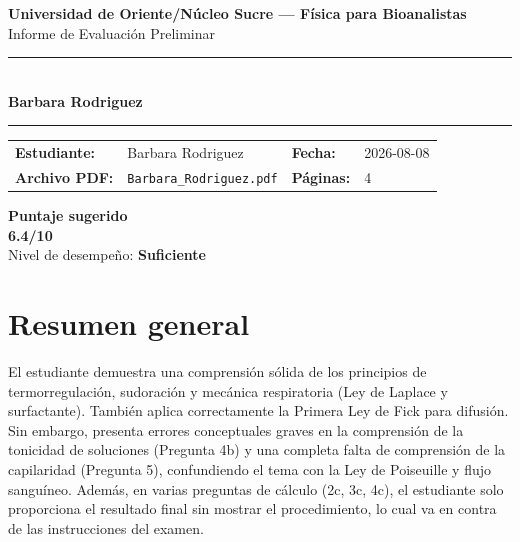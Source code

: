 \documentclass[11pt,a4paper]{article}
\begin{document}
\begin{center}
  {\Large\bfseries\color{azulTitulo} Universidad de Oriente/Núcleo Sucre --- Física para Bioanalistas}\\[4pt]
  {\large Informe de Evaluación Preliminar}\\[12pt]
  \rule{\linewidth}{1.2pt}\\[6pt]
  {\LARGE\bfseries Barbara Rodriguez}\\[4pt]
  \rule{\linewidth}{0.6pt}
\end{center}

\vspace{4pt}
\begin{tcolorbox}[cajaTitulo, title=Datos del informe]
\begin{tabular}{@{}llll@{}}
  \textbf{Estudiante:}  & Barbara Rodriguez  &
  \textbf{Fecha:}       & 2026-08-08 \\[4pt]
  \textbf{Archivo PDF:} & \texttt{Barbara\_Rodriguez.pdf}  &
  \textbf{Páginas:}     & 4 \\
\end{tabular}
\end{tcolorbox}

\vspace{6pt}
\begin{center}
  \begin{tcolorbox}[
    enhanced,
    colback=white, colframe=desempeno_suficiente,
    width=0.62\linewidth,
    boxrule=2pt,
    halign=center, valign=center,
    top=8pt, bottom=8pt,
  ]
    \centering
    {\large\bfseries Puntaje sugerido}\\[6pt]
    {\Huge\bfseries\color{desempeno_suficiente} 6.4/10}\\[6pt]
    {\large Nivel de desempeño: \textbf{\color{desempeno_suficiente} Suficiente}}
  \end{tcolorbox}
\end{center}

\section*{Resumen general}
El estudiante demuestra una comprensión sólida de los principios de termorregulación, sudoración y mecánica respiratoria (Ley de Laplace y surfactante). También aplica correctamente la Primera Ley de Fick para difusión. Sin embargo, presenta errores conceptuales graves en la comprensión de la tonicidad de soluciones (Pregunta 4b) y una completa falta de comprensión de la capilaridad (Pregunta 5), confundiendo el tema con la Ley de Poiseuille y flujo sanguíneo. Además, en varias preguntas de cálculo (2c, 3c, 4c), el estudiante solo proporciona el resultado final sin mostrar el procedimiento, lo cual va en contra de las instrucciones del examen.
\end{document}

